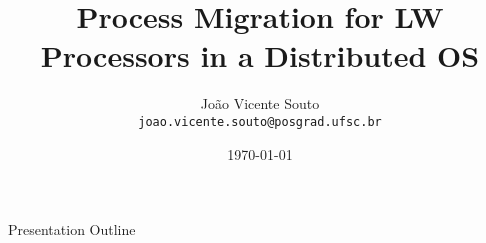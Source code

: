 \documentclass[english]{lapesd-slides}
\title[Process Migration for Lightweight Manycore Processors in a Distributed
Operating System]{
	Process Migration for LW Processors in a Distributed OS
}
\author[J. V. Souto]{
	\large João Vicente Souto\\
	{\small \texttt{joao.vicente.souto@posgrad.ufsc.br}}
}
\institute{
	\fontsize{10.5}{12.6}\selectfont 
	Parallel Computing - Computer Science\\
	INE/UFSC, Florianópolis\\
}
\date{\today}
\begin{document}
\titleframe

\begin{frame}{Presentation Outline}
  \tableofcontents
\end{frame}

\showsections









\thanksframe

\end{document}

